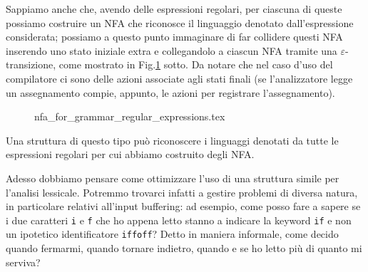 \documentclass[class=book, crop=false, oneside, 12pt]{standalone}
\begin{document}
Sappiamo anche che, avendo delle espressioni regolari, per ciascuna di queste possiamo costruire un NFA che riconosce il linguaggio denotato dall'espressione considerata; possiamo a questo punto immaginare di far collidere questi NFA inserendo uno stato iniziale extra e collegandolo a ciascun NFA tramite una \(\varepsilon\)-transizione, come mostrato in Fig.\ref{nfa_for_grammar_regular_expressions} sotto.
Da notare che nel caso d'uso del compilatore ci sono delle azioni associate agli stati finali (se l'analizzatore legge un assegnamento compie, appunto, le azioni per registrare l'assegnamento).

\begin{figure}[H]
    \centering
    {nfa_for_grammar_regular_expressions.tex}
    \caption{}
    \label{nfa_for_grammar_regular_expressions}
\end{figure}

Una struttura di questo tipo può riconoscere i linguaggi denotati da tutte le espressioni regolari per cui abbiamo costruito degli NFA. 

Adesso dobbiamo pensare come ottimizzare l'uso di una struttura simile per l'analisi lessicale. Potremmo trovarci infatti a gestire problemi di diversa natura, in particolare relativi all'input buffering: ad esempio, come posso fare a sapere se i due caratteri \texttt{i} e \texttt{f} che ho appena letto stanno a indicare la keyword \texttt{if} e non un ipotetico identificatore \texttt{iffoff}? Detto in maniera informale, come decido quando fermarmi, quando tornare indietro, quando e se ho letto più di quanto mi serviva?
\end{document}
